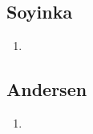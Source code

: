 \documentclass[a4paper, 11pt, hidelinks]{article}
\begin{document}
\subsection{Soyinka}


\begin{enumerate}
    \item 
\end{enumerate}




\subsection{Andersen}


\begin{enumerate}
    \item 
\end{enumerate}
\end{document}
